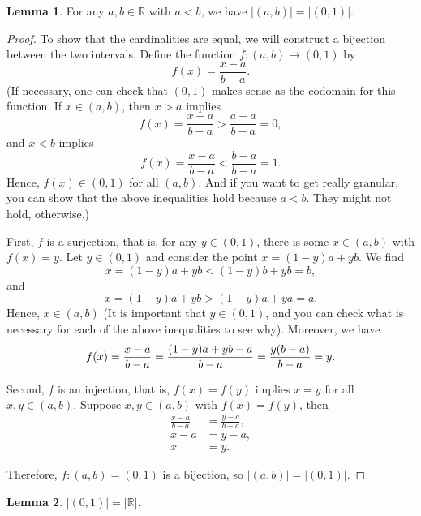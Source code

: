 \documentclass[12pt]{article}
\theoremstyle{definition}
\newtheorem{lemma}{Lemma}
\newcommand{\R}{\mathbb{R}}
\begin{document}
\begin{lemma}
    For any $a, b \in \R$ with $a < b$, we have $|(a, b)| = |(0, 1)|$.
\end{lemma}

\begin{proof}
    To show that the cardinalities are equal, we will construct a bijection between the two intervals. Define the function $f : (a, b) \to (0, 1)$ by
    \[
        f(x) = \frac{x - a}{b - a}.
    \]
    (If necessary, one can check that $(0, 1)$ makes sense as the codomain for this function. If $x \in (a, b)$, then $x > a$ implies
    \[
        f(x) = \frac{x - a}{b - a} > \frac{a - a}{b - a} = 0,
    \]
    and $x < b$ implies
    \[
        f(x) = \frac{x - a}{b - a} < \frac{b - a}{b - a} = 1.
    \]
    Hence, $f(x) \in (0, 1)$ for all $(a, b)$. And if you want to get really granular, you can show that the above inequalities hold because $a < b$. They might not hold, otherwise.)
    
    First, $f$ is a surjection, that is, for any $y \in (0, 1)$, there is some $x \in (a, b)$ with $f(x) = y$. Let $y \in (0, 1)$ and consider the point $x = (1 - y)a + yb$. We find
    \[
        x = (1 - y)a + yb < (1 - y)b + yb = b,
    \]
    and
    \[
        x = (1 - y)a + yb > (1 - y)a + ya = a.
    \]
    Hence, $x \in (a, b)$ (It is important that $y \in (0, 1)$, and you can check what is necessary for each of the above inequalities to see why). Moreover, we have
    \[
        f(x)
            = \frac{x - a}{b - a}
            = \frac{(1 - y)a + yb - a}{b - a} \\
            = \frac{y(b - a)}{b - a} \\
            = y.
    \]
    
    Second, $f$ is an injection, that is, $f(x) = f(y)$ implies $x = y$ for all $x, y \in (a, b)$. Suppose $x, y \in (a, b)$ with $f(x) = f(y)$, then
    \begin{align*}
        \frac{x - a}{b - a} &= \frac{y - a}{b - a}, \\
        x - a &= y - a, \\
        x &= y.
    \end{align*}
    
    Therefore, $f : (a, b) = (0, 1)$ is a bijection, so $|(a, b)| = |(0, 1)|$.
    
\end{proof}

\newpage
\begin{lemma}
    $|(0, 1)| = |\R|$.
\end{lemma}
\end{document}
